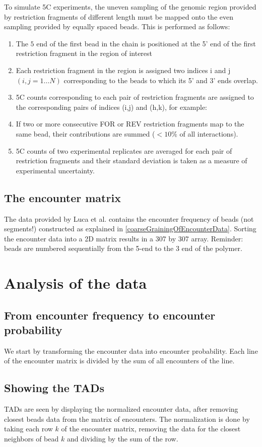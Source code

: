 \documentclass[12pt]{paper}
\begin{document}
To simulate 5C experiments, the uneven sampling of the genomic region provided by restriction fragments of different length must be mapped onto the even sampling provided by equally spaced beads. This is performed as follows:

\begin{enumerate}
\item The $5$ end of the first bead in the chain is positioned at the 5’ end of the first restriction fragment in the region of interest 
\item Each restriction fragment in the region is assigned two indices i and j $(i,j=1…N)$ corresponding to the beads to which its 5’ and 3’ ends overlap.
\item 5C counts corresponding to each pair of restriction fragments are assigned to the corresponding pairs of indices (i,j) and (h,k), for example:
\item If two or more consecutive FOR or REV restriction fragments map to the same bead, their contributions are summed ($<10\%$ of all interactions).
\item 5C counts of two experimental replicates are averaged for each pair of restriction fragments and their standard deviation is taken as a measure of experimental uncertainty.
\end{enumerate}

\subsection{The encounter matrix}
The data provided by Luca et al. contains the encounter frequency of beads (not segments!) constructed as explained in \ref{coarseGrainingOfEncounterData}. Sorting the encounter data into a 2D matrix results in a 307 by 307 array. Reminder: beads are numbered sequentially from the 5-end to the 3 end of the polymer.

\section{Analysis of the data}

\subsection{From encounter frequency to encounter probability}
We start by transforming the encounter data into encounter probability. Each line of the encounter matrix is divided by the sum of all encounters of the line.

\subsection{Showing the TADs}
TADs are seen by displaying the normalized encounter data, after removing closest beads data from the matrix of encounters. 
The normalization is done by taking each row $k$ of the encounter matrix, removing the data for the closest neighbors of bead $k$ and dividing by the sum of the row. 
 
\end{document}
